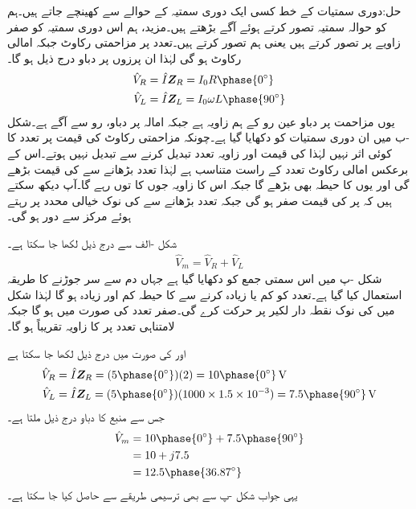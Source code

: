 حل:دوری سمتیات کے خط کسی ایک دوری سمتیہ کے حوالے سے کھینچے جاتے ہیں۔ہم  کو حوالہ سمتیہ تصور کرتے ہوئے آگے بڑھتے ہیں۔مزید، ہم اس دوری سمتیہ کو صفر زاویے پر تصور کرتے ہیں یعنی ہم  تصور کرتے ہیں۔تعدد  پر مزاحمتی رکاوٹ  جبکہ  امالی رکاوٹ  ہو گی لہٰذا ان پرزوں پر دباو درج ذیل ہو گا۔
\begin{align*}
\hat{V}_R&=\hat{I} \bZ_R=I_0 R \phase{0^{\circ}}\\
\hat{V}_L&=\hat{I} \bZ_L=I_0 \omega L \phase{90^{\circ}}
\end{align*}
یوں مزاحمت پر دباو عین رو کے ہم زاویہ ہے جبکہ امالہ پر دباو، رو سے  آگے ہے۔شکل -ب میں ان دوری سمتیات کو دکھایا گیا ہے۔چونکہ مزاحمتی رکاوٹ کی قیمت پر تعدد کا کوئی اثر نہیں لہٰذا  کی قیمت اور زاویہ تعدد تبدیل کرنے سے تبدیل نہیں ہوتے۔اس کے برعکس امالی رکاوٹ تعدد کے راست متناسب ہے لہٰذا تعدد بڑھانے سے  کی قیمت بڑھے گی اور یوں  کا حیطہ بھی بڑھے گا جبکہ اس کا زاویہ جوں کا توں رہے گا۔آپ دیکھ سکتے ہیں کہ  پر  کی قیمت صفر ہو گی جبکہ تعدد بڑھانے سے  کی نوک خیالی محدد پر رہتے ہوئے  مرکز سے دور ہو گی۔

شکل -الف سے درج ذیل لکھا جا سکتا ہے۔
\begin{align*}
\hat{V}_m=\hat{V}_R+\hat{V}_L
\end{align*}
شکل -پ میں اس سمتی جمع کو دکھایا گیا ہے جہاں دم سے سر جوڑنے کا طریقہ استعمال کیا گیا ہے۔تعدد کو کم یا زیادہ کرنے  سے  کا حیطہ کم اور زیادہ ہو گا لہٰذا شکل میں  کی نوک نقطہ دار لکیر پر حرکت کرے گی۔صفر تعدد کی صورت میں  ہو گا جبکہ لامتناہی  تعدد پر  کا زاویہ تقریباً  ہو گا۔
 
 اور  کی صورت میں درج ذیل لکھا جا سکتا ہے
\begin{align*}
\hat{V}_R&=\hat{I} \bZ_R=(5\phase{0^{\circ}})(2)=10\phase{0^{\circ}} \, \si{\volt}\\
\hat{V}_L&=\hat{I} \bZ_L=(5\phase{0^{\circ}})(1000 \times 1.5\times 10^{-3})=7.5\phase{90^{\circ}}\, \si{\volt}
\end{align*}
جس سے منبع کا دباو درج ذیل ملتا ہے۔
\begin{align*}
\hat{V}_m&=10\phase{0^{\circ}}+7.5\phase{90^{\circ}}\\
&=10+j7.5\\
&=12.5\phase{36.87^{\circ}}
\end{align*}
یہی جواب شکل -پ سے  بھی ترسیمی طریقے سے حاصل کیا جا سکتا ہے۔

